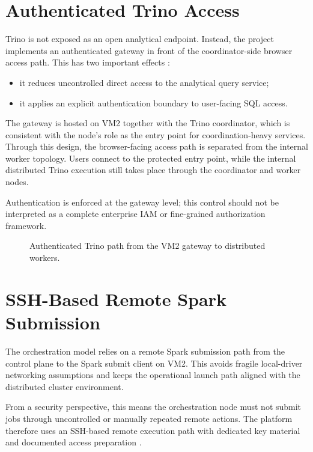 \section{Authenticated Trino Access}
Trino is not exposed as an open analytical endpoint. Instead, the project implements an authenticated gateway in front of the coordinator-side browser access path. This has two important effects \cite{trino_docs}:
\begin{itemize}
    \item it reduces uncontrolled direct access to the analytical query service;
    \item it applies an explicit authentication boundary to user-facing SQL access.
\end{itemize}

The gateway is hosted on VM2 together with the Trino coordinator, which is consistent with the node's role as the entry point for coordination-heavy services. Through this design, the browser-facing access path is separated from the internal worker topology. Users connect to the protected entry point, while the internal distributed Trino execution still takes place through the coordinator and worker nodes.

Authentication is enforced at the gateway level; this control should not be interpreted as a complete enterprise IAM or fine-grained authorization framework.

\begin{figure}[H]
    \centering
    
    \caption{Authenticated Trino path from the VM2 gateway to distributed workers.}
    \label{fig:chapter7-trino-auth-gateway}
\end{figure}

\section{SSH-Based Remote Spark Submission}
The orchestration model relies on a remote Spark submission path from the control plane to the Spark submit client on VM2. This avoids fragile local-driver networking assumptions and keeps the operational launch path aligned with the distributed cluster environment.

From a security perspective, this means the orchestration node must not submit jobs through uncontrolled or manually repeated remote actions. The platform therefore uses an SSH-based remote execution path with dedicated key material and documented access preparation \cite{openssh_docs}.


